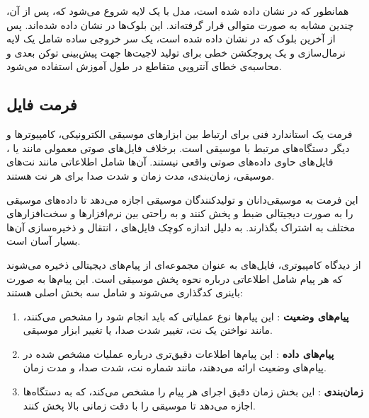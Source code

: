 همانطور که در  نشان داده شده است،
مدل با یک لایه  شروع می‌شود که، پس از آن، چندین   مشابه به صورت متوالی قرار گرفته‌اند. این بلوک‌ها در  نشان داده شده‌اند. پس از آخرین بلوک که در  نشان داده شده است، یک سر خروجی ساده شامل یک لایه نرمال‌سازی  و یک پروجکشن خطی برای تولید لاجیت‌ها  جهت پیش‌بینی توکن بعدی و محاسبه‌ی خطای آنتروپی متقاطع  در طول آموزش استفاده می‌شود.

\subsection{فرمت فایل }

فرمت   \cite{de2017understanding} یک استاندارد فنی برای ارتباط بین ابزارهای موسیقی الکترونیکی، کامپیوترها و دیگر دستگاه‌های مرتبط با موسیقی است. برخلاف فایل‌های صوتی معمولی مانند  یا ، فایل‌های  حاوی داده‌های صوتی واقعی نیستند. آن‌ها شامل اطلاعاتی مانند نت‌های موسیقی، زمان‌بندی، مدت زمان و شدت صدا برای هر نت هستند.

این فرمت به موسیقی‌دانان و تولیدکنندگان موسیقی اجازه می‌دهد تا داده‌های موسیقی را به صورت دیجیتالی ضبط و پخش کنند و به راحتی بین نرم‌افزارها و سخت‌افزارهای مختلف به اشتراک بگذارند. به دلیل اندازه کوچک فایل‌های ، انتقال و ذخیره‌سازی آن‌ها بسیار آسان است.

از دیدگاه کامپیوتری، فایل‌های  به عنوان مجموعه‌ای از پیام‌های دیجیتالی ذخیره می‌شوند که هر پیام شامل اطلاعاتی درباره نحوه پخش موسیقی است. این پیام‌ها به صورت باینری کدگذاری می‌شوند و شامل سه بخش اصلی هستند:

\begin{enumerate}
      \def\labelenumi{\arabic{enumi}.}
      \item
            \textbf{پیام‌های وضعیت }: این پیام‌ها نوع عملیاتی که
            باید انجام شود را مشخص می‌کنند، مانند نواختن یک نت، تغییر شدت صدا، یا
            تغییر ابزار موسیقی.
      \item
            \textbf{پیام‌های داده }: این پیام‌ها اطلاعات دقیق‌تری
            درباره عملیات مشخص شده در پیام‌های وضعیت ارائه می‌دهند، مانند شماره نت،
            شدت صدا، و مدت زمان.
      \item
            \textbf{زمان‌بندی }: این بخش زمان دقیق اجرای هر پیام را مشخص
            می‌کند، که به دستگاه‌ها اجازه می‌دهد تا موسیقی را با دقت زمانی بالا پخش
            کنند.
\end{enumerate}

